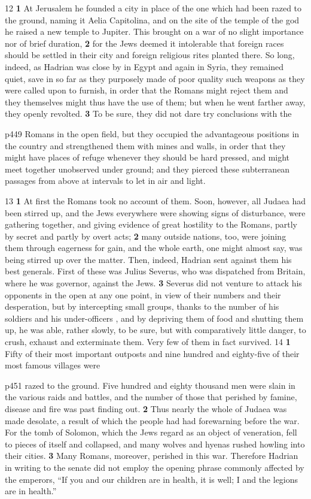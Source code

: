 12
\textbf{1} At Jerusalem he founded a city in place of the one which had been razed to the ground, naming it Aelia Capitolina, and on the site of the temple of the god he raised a new temple to Jupiter. This brought on a war of no slight importance nor of brief duration, \textbf{2} for the Jews deemed it intolerable that foreign races should be settled in their city and foreign religious rites planted there. So long, indeed, as Hadrian was close by in Egypt and again in Syria, they remained quiet, save in so far as they purposely made of poor quality such weapons as they were called upon to furnish, in order that the Romans might reject them and they themselves might thus have the use of them; but when he went farther away, they openly revolted. \textbf{3} To be sure, they did not dare try conclusions with the

p449 Romans in the open field, but they occupied the advantageous positions in the country and strengthened them with mines and walls, in order that they might have places of refuge whenever they should be hard pressed, and might meet together unobserved under ground; and they pierced these subterranean passages from above at intervals to let in air and light.

13
\textbf{1} At first the Romans took no account of them. Soon, however, all Judaea had been stirred up, and the Jews everywhere were showing signs of disturbance, were gathering together, and giving evidence of great hostility to the Romans, partly by secret and partly by overt acts; \textbf{2} many outside nations, too, were joining them through eagerness for gain, and the whole earth, one might almost say, was being stirred up over the matter. Then, indeed, Hadrian sent against them his best generals. First of these was Julius Severus, who was dispatched from Britain, where he was governor, against the Jews. \textbf{3} Severus did not venture to attack his opponents in the open at any one point, in view of their numbers and their desperation, but by intercepting small groups, thanks to the number of his soldiers and his under-officers , and by depriving them of food and shutting them up, he was able, rather slowly, to be sure, but with comparatively little danger, to crush, exhaust and exterminate them. Very few of them in fact survived.
14
\textbf{1} Fifty of their most important outposts and nine hundred and eighty-five of their most famous villages were

p451 razed to the ground. Five hundred and eighty thousand men were slain in the various raids and battles, and the number of those that perished by famine, disease and fire was past finding out. \textbf{2} Thus nearly the whole of Judaea was made desolate, a result of which the people had had forewarning before the war. For the tomb of Solomon, which the Jews regard as an object of veneration, fell to pieces of itself and collapsed, and many wolves and hyenas rushed howling into their cities. \textbf{3} Many Romans, moreover, perished in this war. Therefore Hadrian in writing to the senate did not employ the opening phrase commonly affected by the emperors, ``If you and our children are in health, it is well; I and the legions are in health.''

